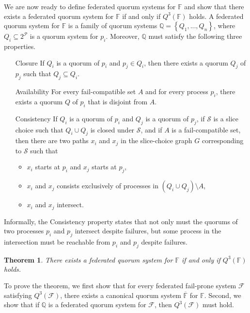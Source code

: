 \documentclass[11pt]{article}
\newtheorem{thm}{Theorem}
\begin{document}
We are now ready to define federated quorum systems for $\mathbb{F}$ and show that there exists a federated quorum system for $\mathbb{F}$ if and only if $Q^3(\mathbb{F})$ holds. A federated quorum system for $\mathbb{F}$ is a family of quorum systems $\mathbb{Q}=\left\{Q_1,...,Q_n\right\}$, where $Q_i\subseteq 2^\mathcal{P}$ is a quorum system for $p_i$. Moreover, $\mathbb{Q}$ must satisfy the following three properties.
\begin{itemize}
  \item [Closure] If $Q_i$ is a quorum of $p_i$ and $p_j\in Q_i$, then there exists a quorum $Q_j$ of $p_j$ such that $Q_j\subseteq Q_i$.
  \item [Availability] For every fail-compatible set $A$ and for every process $p_i$, there exists a quorum $Q$ of $p_i$ that is disjoint from $A$.
  \item[Consistency] If $Q_i$ is a quorum of $p_i$ and $Q_j$ is a quorum of $p_j$, if $\mathcal{S}$ is a slice choice such that $Q_i\cup Q_j$ is closed under $\mathcal{S}$, and if $A$ is a fail-compatible set, then there are two paths $x_i$ and $x_j$ in the slice-choice graph $G$ corresponding to $\mathcal{S}$ such that
    \begin{itemize}
      \item $x_i$ starts at $p_i$ and $x_j$ starts at $p_j$,
      \item $x_i$ and $x_j$ consists exclusively of processes in $\left(Q_i\cup Q_j\right)\setminus A$,
      \item $x_i$ and $x_j$ intersect.
    \end{itemize}
\end{itemize}

Informally, the Consistency property states that not only must the quorums of two processes $p_i$ and $p_j$ intersect despite failures, but some process in the intersection must be reachable from $p_i$ and $p_j$ despite failures.

\begin{thm}
  There exists a federated quorum system for $\mathbb{F}$ if and only if $Q^3(\mathbb{F})$ holds.
\end{thm}

To prove the theorem, we first show that for every federated fail-prone system $\mathcal{F}$ satisfying $Q^3(\mathcal{F})$, there exists a canonical quorum system $\overline{\mathbb{F}}$ for $\mathbb{F}$. Second, we show that if $\mathbb{Q}$ is a federated quorum system for $\mathcal{F}$, then $Q^3(\mathcal{F})$ must hold.
\end{document}

